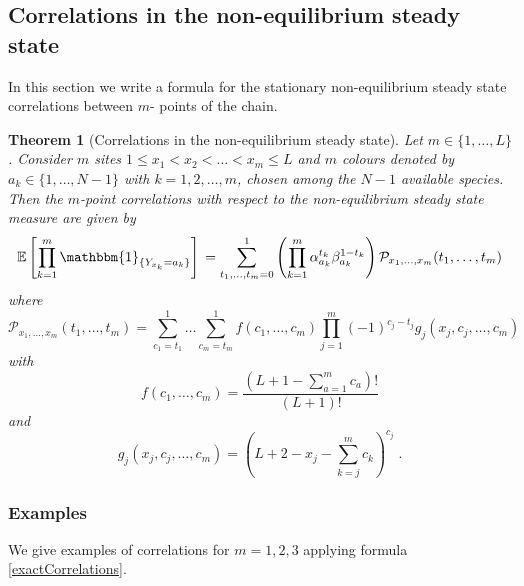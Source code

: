 \documentclass[10pt]{article}
\numberwithin{equation}{section}
\numberwithin{equation}{subsection}
\newtheorem{theorem}{Theorem}
\newcommand{\dt}{\;.}
\begin{document}
\subsection{Correlations in the non-equilibrium steady state}\label{subsection-exact}
In this section we write a formula for the stationary non-equilibrium steady state correlations between $m$- points of the chain.
\begin{theorem}[Correlations in the non-equilibrium steady state]\label{thm-correlations}
Let $m\in \{1,\ldots,L\}$. Consider $m$ sites $1 \le x_{1} < x_2 < \ldots < x_m \le L $ and
{$m$ colours denoted by $a_{k}\in\{1,\ldots,N-1\}$  with $k=1,2,\ldots, m$, chosen among the $N-1$ available species.}  
Then the $m$-point correlations with respect to the non-equilibrium steady state measure are given by 
\begin{equation}\label{exactCorrelations}
\mathbb{E}\left[\prod_{k=1}^{m}\mathbbm{1}_{\{Y_{x_{k}}=a_{k}\}}\right]\\=\sum_{t_{1},\ldots,t_{m}=0}^{1}\left(\prod_{k=1}^{m}\alpha_{a_{k}}^{t_{k}}\beta_{a_{k}}^{1-t_{k}}\right)\mathcal{P}_{x_{1},\ldots,x_{m}}(t_{1},\ldots,t_{m})
\end{equation}
where
\begin{equation}\label{abs-probabilities}
	\mathcal{P}_{x_{1},\ldots,x_{m}}(t_{1},\ldots,t_{m})=\sum_{c_{1}=t_{1}}^{1}\ldots\sum_{c_{m}=t_{m}}^{1}f(c_{1},\ldots,c_{m})\prod_{j=1}^{m}(-1)^{c_{j}-t_{j}}g_{j}(x_{j},c_{j},\ldots,c_{m})
\end{equation}
with
\begin{equation}\label{powerCoeffNOspec}
	f(c_{1},\ldots,c_{m})=\frac{(L+1-\sum_{a=1}^{m}c_{a})!}{(L+1)!}
\end{equation}
and
\begin{equation}\label{powerCoeffSpecies}
	g_{j}(x_{j},c_{j},\ldots,c_{m})=\left(L+2-x_{j}-\sum_{k=j}^{m}c_{k}\right)^{c_{j}}\dt
\end{equation}
\end{theorem}

\subsubsection{Examples}
We give examples  of correlations for $m=1,2,3$ applying formula \eqref{exactCorrelations}.
\end{document}
